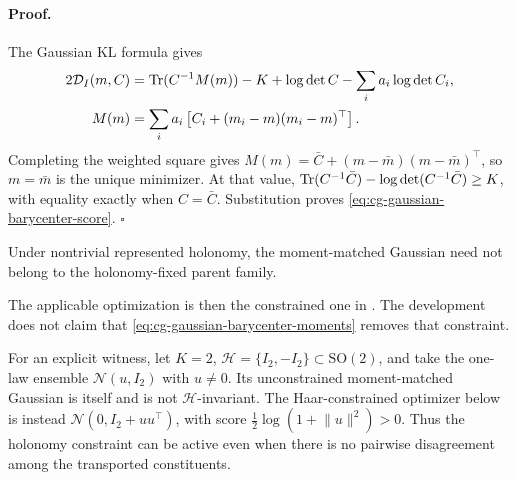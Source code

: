\paragraph{Proof.}
The Gaussian KL formula gives
\begin{equation}
\begin{aligned}
2\mathcal D_I(m,C)
&=\operatorname{Tr}(C^{-1}M(m))-K+\log\det C
-\sum_i a_i\log\det C_i,\\
M(m)&=\sum_i a_i\left[C_i+(m_i-m)(m_i-m)^\top\right].
\end{aligned}
\label{eq:cg-gaussian-barycenter-expansion}
\end{equation}
Completing the weighted square gives
\(M(m)=\bar C+(m-\bar m)(m-\bar m)^\top\), so \(m=\bar m\) is the unique
minimizer. At that value,
\(\operatorname{Tr}(C^{-1}\bar C)-\log\det(C^{-1}\bar C)\geq K\), with equality exactly
when \(C=\bar C\). Substitution proves
\eqref{eq:cg-gaussian-barycenter-score}. \(\square\)

Under nontrivial represented holonomy, the moment-matched Gaussian need not
belong to the holonomy-fixed parent family. 

The
applicable optimization is then the constrained one in
. The development does not claim that
\eqref{eq:cg-gaussian-barycenter-moments} removes that constraint.

For an explicit witness, let \(K=2\),
\(\mathcal H=\{I_2,-I_2\}\subset\mathrm{SO}(2)\), and take the one-law
ensemble \(\mathcal N(u,I_2)\) with \(u\neq0\). Its unconstrained
moment-matched Gaussian is itself and is not \(\mathcal H\)-invariant. The
Haar-constrained optimizer below is instead
\(\mathcal N(0,I_2+uu^\top)\), with score
\(\tfrac12\log(1+\lVert u\rVert^2)>0\). Thus the holonomy constraint can be
active even when there is no pairwise disagreement among the transported
constituents.


